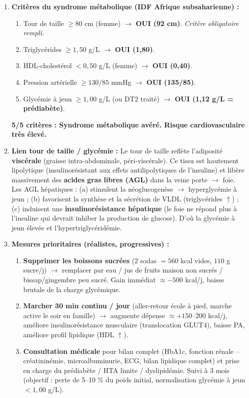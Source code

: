 \documentclass[11pt]{article}
\begin{document}
\begin{corrige}[Exercice n°1]
\begin{enumerate}
    \item \textbf{Critères du syndrome métabolique (IDF Afrique subsaharienne) :}
    \begin{enumerate}
        \item Tour de taille $\ge 80$ cm (femme) $\rightarrow$ \textbf{OUI (92 cm)}. \emph{Critère obligatoire rempli.}
        \item Triglycérides $\ge 1,50$ g/L $\rightarrow$ \textbf{OUI (1,80)}.
        \item HDL-cholestérol $< 0,50$ g/L (femme) $\rightarrow$ \textbf{OUI (0,40)}.
        \item Pression artérielle $\ge 130/85$ mmHg $\rightarrow$ \textbf{OUI (135/85)}.
        \item Glycémie à jeun $\ge 1,00$ g/L (ou DT2 traité) $\rightarrow$ \textbf{OUI (1,12 g/L = prédiabète)}.
    \end{enumerate}
    \textbf{5/5 critères : Syndrome métabolique avéré. Risque cardiovasculaire très élevé.}
    \item \textbf{Lien tour de taille / glycémie :} Le tour de taille reflète l'adiposité \textbf{viscérale} (graisse intra-abdominale, péri-viscérale). Ce tissu est hautement lipolytique (insulinorésistant aux effets antilipolytiques de l'insuline) et libère massivement des \textbf{acides gras libres (AGL)} dans la veine porte $\rightarrow$ foie. Les AGL hépatiques : (a) stimulent la néoglucogenèse $\rightarrow$ hyperglycémie à jeun ; (b) favorisent la synthèse et la sécrétion de VLDL (triglycérides $\uparrow$) ; (c) induisent une \textbf{insulinorésistance hépatique} (le foie ne répond plus à l'insuline qui devrait inhiber la production de glucose). D'où la glycémie à jeun élevée et l'hypertriglycéridémie.
    \item \textbf{Mesures prioritaires (réalistes, progressives) :}
    \begin{enumerate}
        \item \textbf{Supprimer les boissons sucrées} (2 sodas $= 560$ kcal vides, $110$ g sucre/j) $\rightarrow$ remplacer par eau / jus de fruits maison non sucrés / bissap/gingembre peu sucré. Gain immédiat $\approx -500$ kcal/j, baisse brutale de la charge glycémique.
        \item \textbf{Marcher 30 min continu / jour} (aller-retour école à pied, marche active le soir en famille) $\rightarrow$ augmente dépense $\approx +150$--$200$ kcal/j, améliore insulinorésistance musculaire (translocation GLUT4), baisse PA, améliore profil lipidique (HDL $\uparrow$).
        \item \textbf{Consultation médicale} pour bilan complet (HbA1c, fonction rénale -- créatininémie, microalbuminurie, ECG, bilan lipidique complet) et prise en charge du prédiabète / HTA limite / dyslipidémie. Suivi à 3 mois (objectif : perte de 5--10 \% du poids initial, normalisation glycémie à jeun $< 1,00$ g/L).
    \end{enumerate}
\end{enumerate}
\end{corrige}
\end{document}
